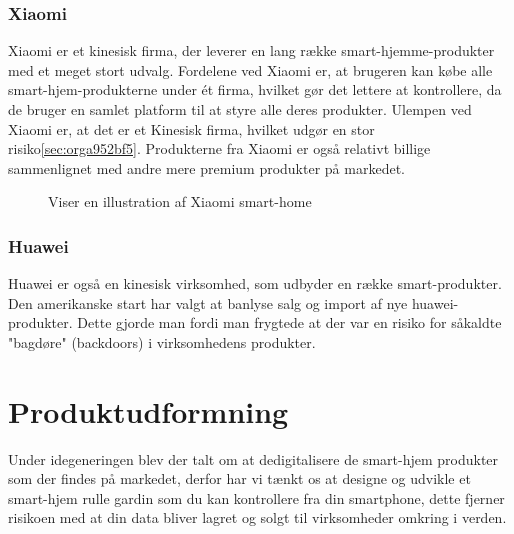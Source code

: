 \documentclass[11pt]{article}
\begin{document}
\subsubsection{Xiaomi}
Xiaomi er et kinesisk firma, der leverer en lang række smart-hjemme-produkter med et meget stort udvalg. Fordelene ved Xiaomi er, at brugeren kan købe alle smart-hjem-produkterne under ét firma, hvilket gør det lettere at kontrollere, da de bruger en samlet platform til at styre alle deres produkter. Ulempen ved Xiaomi er, at det er et Kinesisk firma, hvilket udgør en stor risiko\ref{sec:orga952bf5}. Produkterne fra Xiaomi er også relativt billige sammenlignet med andre mere premium produkter på markedet.

\begin{figure}[htbp]
\centering
{}
\caption{Viser en illustration af Xiaomi smart-home}
\end{figure}

\subsubsection{Huawei}
Huawei er også en kinesisk virksomhed, som udbyder en række smart-produkter. Den amerikanske start har valgt at banlyse salg og import af nye huawei-produkter. Dette gjorde man fordi man frygtede at der var en risiko for såkaldte "bagdøre" (backdoors) i virksomhedens produkter.
\newpage

\section{Produktudformning}
\label{sec:org563ee9e}
Under idegeneringen blev der talt om at dedigitalisere de smart-hjem produkter som der findes på markedet, derfor har vi tænkt os at designe og udvikle et smart-hjem rulle gardin som du kan kontrollere fra din smartphone, dette fjerner risikoen med at din data bliver lagret og solgt til virksomheder omkring i verden.
\end{document}
